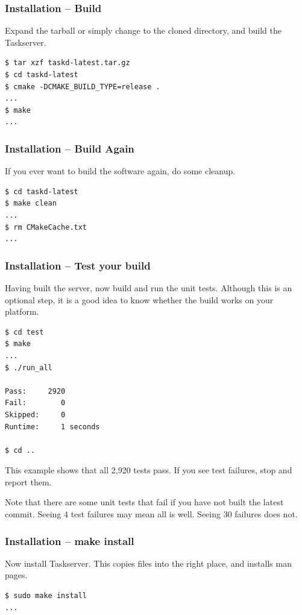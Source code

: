 \documentclass[t,handout]{beamer}
\begin{document}
\begin{frame}[fragile]\frametitle{Installation -- Build}
    \vfill
    Expand the tarball or simply change to the cloned directory, and build the Taskserver.

    \begin{lstlisting}
$ tar xzf taskd-latest.tar.gz
$ cd taskd-latest
$ cmake -DCMAKE_BUILD_TYPE=release .
...
$ make
...\end{lstlisting}
\end{frame}

\begin{frame}[fragile]\frametitle{Installation -- Build Again}
    \vfill
    If you ever want to build the software again, do some cleanup.

    \begin{lstlisting}
$ cd taskd-latest
$ make clean
...
$ rm CMakeCache.txt
...\end{lstlisting}
\end{frame}

\begin{frame}[fragile]\frametitle{Installation -- Test your build}
    Having built the server, now build and run the unit tests. Although this is an optional step, it is a good idea to know whether the build works on your platform.

    \begin{lstlisting}
$ cd test
$ make
...
$ ./run_all

Pass:     2920
Fail:        0
Skipped:     0
Runtime:     1 seconds

$ cd ..\end{lstlisting}

    This example shows that all 2,920 tests pass.  If you see test failures, stop and report them.

    Note that there are some unit tests that fail if you have not built the latest commit. Seeing 4 test failures may mean all is well. Seeing 30 failures does not.
\end{frame}

\begin{frame}[fragile]\frametitle{Installation -- make install}
    Now install Taskserver.  This copies files into the right place, and installs man pages.

    \begin{lstlisting}
$ sudo make install
...\end{lstlisting}
\end{frame}
\end{document}
